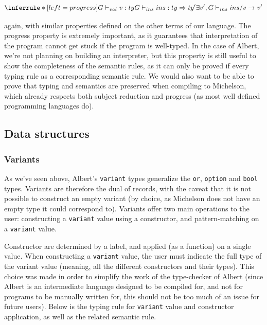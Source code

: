 \documentclass{report}
\begin{document}
$$
\inferrule* [left=progress]
            { G \vdash_{val} v : ty \\ G \vdash_{ins} ins : ty \Rightarrow ty' }
            { \exists v', G \vdash_{ins} ins / v \rightarrow v' }
$$

again, with similar properties defined on the other terms of our language. The progress property is extremely important, as it guarantees that interpretation of the program cannot get stuck if the program is well-typed. In the case of Albert, we're not planning on building an interpreter, but this property is still useful to show the completeness of the semantic rules, as it can only be proved if every typing rule as a corresponding semantic rule. We would also want to be able to prove that typing and semantics are preserved when compiling to Michelson, which already respects both subject reduction and progress (as most well defined programming languages do).

\subsection{Data structures}

\subsubsection{Variants}

As we've seen above, Albert's \texttt{variant} types generalize the \texttt{or}, \texttt{option} and \texttt{bool} types. Variants are therefore the dual of records, with the caveat that it is not possible to construct an empty variant (by choice, as Michelson does not have an empty type it could correspond to). Variants offer two main operations to the user: constructing a \texttt{variant} value using a constructor, and pattern-matching on a \texttt{variant} value.

Constructor are determined by a label, and applied (as a function) on a single value. When constructing a \texttt{variant} value, the user must indicate the full type of the variant value (meaning, all the different constructors and their types). This choice was made in order to simplify the work of the type-checker of Albert (since Albert is an intermediate language designed to be compiled for, and not for programs to be manually written for, this should not be too much of an issue for future users). Below is the typing rule for \texttt{variant} value and constructor application, as well as the related semantic rule.
\end{document}

